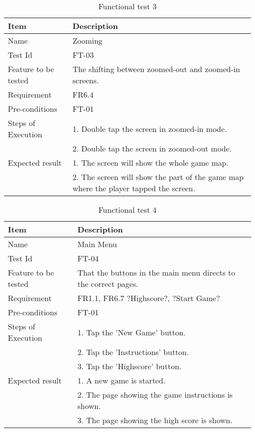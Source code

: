 \begin{table}[H]
\centering
	\begin{tabular}{ l | p{8cm} }
		\hline
		{\bf Item} & {\bf Description} \\ \hline
		Name & Zooming \\ 
		Test Id & FT-03 \\ 
		Feature to be tested & The shifting between zoomed-out and zoomed-in screens. \\ 
		Requirement & FR6.4 \\ 
		Pre-conditions & FT-01 \\ 
		Steps of Execution & 1. Double tap the screen in zoomed-in mode.\\ 
		& 2. Double tap the screen in zoomed-out mode. \\
		Expected result & 1. The screen will show the whole game map. \\
		& 2. The screen will show the part of the game map where the player tapped the screen. \\
	\end{tabular}
	\caption{Functional test 3}
\end{table}

\begin{table}[H]
\centering
	\begin{tabular}{ l | p{8cm} }
		\hline
		{\bf Item} & {\bf Description} \\ \hline
		Name & Main Menu \\ 
		Test Id & FT-04 \\ 
		Feature to be tested & That the buttons in the main menu directs to the correct pages. \\ 
		Requirement & FR1.1, FR6.7 ?Highscore?, ?Start Game? \\ 
		Pre-conditions & FT-01 \\ 
		Steps of Execution & 1. Tap the 'New Game' button. \\
		& 2. Tap the 'Instructions' button. \\
		& 3. Tap the 'Highscore' button. \\
		Expected result & 1. A new game is started. \\
		& 2. The page showing the game instructions is shown. \\
		& 3. The page showing the high score is shown. \\
	\end{tabular}
	\caption{Functional test 4}
\end{table}

